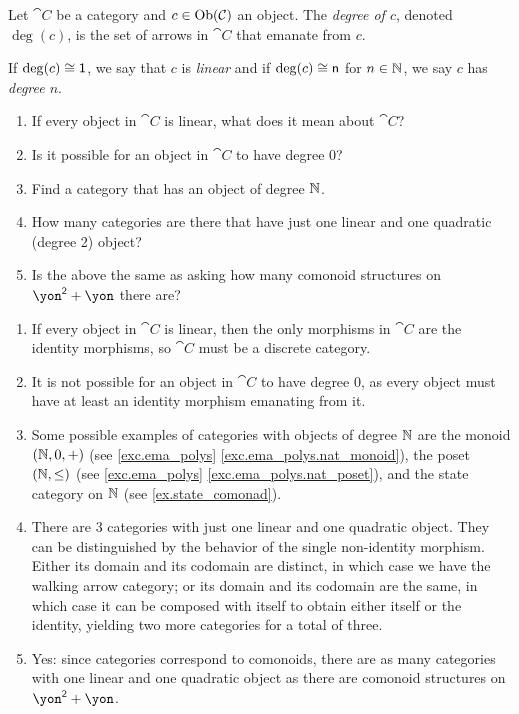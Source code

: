 \documentclass[Book-Poly]{subfiles}
\begin{document}
\begin{definition}
Let $\cat{C}$ be a category and $c\in\operatorname{Ob}(\mathcal{C})$ an object. The \emph{degree of $c$}, denoted $\deg(c)$, is the set of arrows in $\cat{C}$ that emanate from $c$.

If $\deg(c)\cong \textsf{1}$, we say that $c$ is \emph{linear} and if $\deg(c)\cong\mathsf{n}$ for $n\in\mathbb{N}$, we say $c$ has \emph{degree $n$}.
\end{definition}

\begin{exercise}
\begin{enumerate}
	\item If every object in $\cat{C}$ is linear, what does it mean about $\cat{C}$?
	\item Is it possible for an object in $\cat{C}$ to have degree $0$?
	\item Find a category that has an object of degree $\mathbb{N}$.
	\item How many categories are there that have just one linear and one quadratic (degree 2) object?
	\item Is the above the same as asking how many comonoid structures on $\yon^\2+\yon$ there are?
\end{enumerate}
\begin{solution}
\begin{enumerate}
    \item If every object in $\cat{C}$ is linear, then the only morphisms in $\cat{C}$ are the identity morphisms, so $\cat{C}$ must be a discrete category.
    \item It is not possible for an object in $\cat{C}$ to have degree $0$, as every object must have at least an identity morphism emanating from it.
    \item Some possible examples of categories with objects of degree $\mathbb{N}$ are the monoid $(\mathbb{N}, 0, +)$ (see \cref{exc.ema_polys} \cref{exc.ema_polys.nat_monoid}), the poset $(\mathbb{N}, \leq)$ (see \cref{exc.ema_polys} \cref{exc.ema_polys.nat_poset}), and the state category on $\mathbb{N}$ (see \cref{ex.state_comonad}).
    \item There are $3$ categories with just one linear and one quadratic object. They can be distinguished by the behavior of the single non-identity morphism.
    Either its domain and its codomain are distinct, in which case we have the walking arrow category; or its domain and its codomain are the same, in which case it can be composed with itself to obtain either itself or the identity, yielding two more categories for a total of three.
    \item Yes: since categories correspond to comonoids, there are as many categories with one linear and one quadratic object as there are comonoid structures on $\yon^\2 + \yon$.
\end{enumerate}
\end{solution}
\end{exercise}
\end{document}
